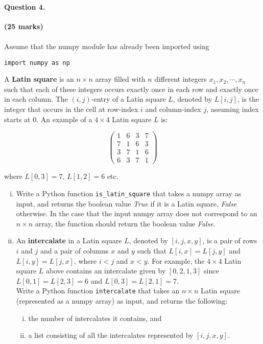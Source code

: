 \documentclass[12pt]{article}
\begin{document}
\paragraph{Question 4. }\hfill {\bf (25 marks)}\\\\
Assume that the numpy module has already been imported using
\begin{verbatim}
import numpy as np
\end{verbatim}
\noindent A \textbf{Latin square} is an $n\times n$ array filled with $n$ different integers $x_1,x_2,\cdots,x_n$ such that each of these integers occurs exactly once in each row and exactly once in each column. The $(i,j)$-entry of a Latin square $L$, denoted by $L[i,j]$, is the integer that occurs in the cell at row-index $i$ and column-index $j$, assuming index starts at 0. An example of a $4\times 4$ Latin square $L$ is:
\vspace{-1em}
{\par \centering
\[
\begin{pmatrix}
1&6&3&7\\7&1&6&3\\3&7&1&6\\6&3&7&1
\end{pmatrix}
\]
}
where $L[0,3]=7$, $L[1,2]=6$ etc.
\begin{enumerate}[(i)]
\item Write a Python function \verb|is_latin_square| that takes a numpy array as input, and returns the boolean value \textit{True} if it is a Latin square, \textit{False} otherwise. In the case that the input numpy array does not correspond to an $n\times n$ array, the function should return the boolean value \textit{False}.
\item An \textbf{intercalate} in a Latin square $L$, denoted by $[i,j,x,y]$, is a pair of rows $i$ and $j$ and a pair of columns $x$ and $y$ such that $L[i,x]=L[j,y]$ and $L[i,y]=L[j,x]$, where $i<j$ and $x<y$. For example, the $4\times 4$ Latin square $L$ above contains an intercalate given by $[0,2,1,3]$ since $L[0,1]=L[2,3]=6$ and $L[0,3]=L[2,1]=7$.\\Write a Python function \verb|intercalate| that takes an $n\times n$ Latin square (represented as a numpy array) as input, and returns the following:
\begin{enumerate}[(i)]
\item the number of intercalates it contains, and
\item a list consisting of all the intercalates represented by $[i,j,x,y]$.
\end{enumerate}
\end{enumerate}
\end{document}
